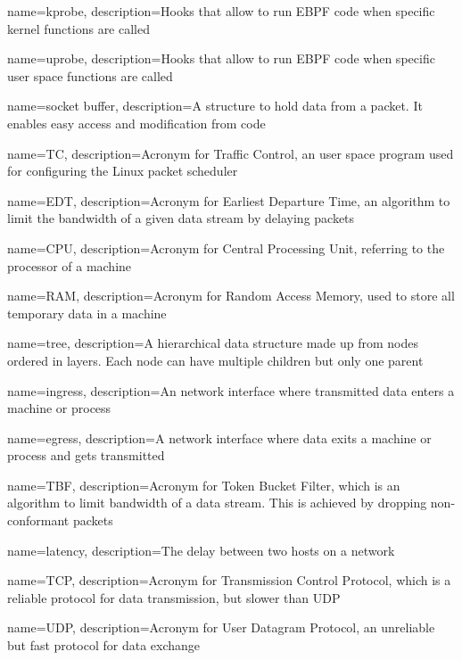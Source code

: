 {
    name=kprobe,
    description={Hooks that allow to run EBPF code when specific kernel functions are called}
}

{
    name=uprobe,
    description={Hooks that allow to run EBPF code when specific user space functions are called}
}

{
    name=socket buffer,
    description={A structure to hold data from a packet. It enables easy access and modification from code}
}

{
    name=TC,
    description={Acronym for Traffic Control, an user space program used for configuring the Linux packet scheduler}
}

{
    name=EDT,
    description={Acronym for Earliest Departure Time, an algorithm to limit the bandwidth of a given data stream by delaying packets}
}

{
    name=CPU,
    description={Acronym for Central Processing Unit, referring to the processor of a machine}
}

{
    name=RAM,
    description={Acronym for Random Access Memory, used to store all temporary data in a machine}
}

{
    name=tree,
    description={A hierarchical data structure made up from nodes ordered in layers. Each node can have multiple children but only one parent}
}

{
    name=ingress,
    description={An network interface where transmitted data enters a machine or process}
}

{
    name=egress,
    description={A network interface where data exits a machine or process and gets transmitted}
}

{
    name=TBF,
    description={Acronym for Token Bucket Filter, which is an algorithm to limit bandwidth of a data stream. This is achieved by dropping non-conformant packets}
}

{
    name=latency,
    description={The delay between two hosts on a network}
}

{
    name=TCP,
    description={Acronym for Transmission Control Protocol, which is a reliable protocol for data transmission, but slower than UDP}
}

{
    name=UDP,
    description={Acronym for User Datagram Protocol, an unreliable but fast protocol for data exchange}
}

